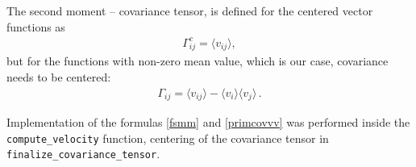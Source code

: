 The second moment -- covariance tensor, is defined for the centered vector functions as
%
%
%
%
\begin{align}\label{primcovvv}
\Gamma_{ij}^c = \langle v_{ij} \rangle,
\end{align}
but for the functions with non-zero mean value, which is our case, covariance needs to be centered:
\begin{align}\label{covvv}
\Gamma_{ij} = \langle v_{ij} \rangle - \langle v_i \rangle \langle v_j \rangle \, .
\end{align}

Implementation of the formulas \ref{fsmm} and \ref{primcovvv} was performed inside the \lstinline|compute_velocity| function, centering of the covariance tensor \label{covvvv} in \lstinline|finalize_covariance_tensor|.

